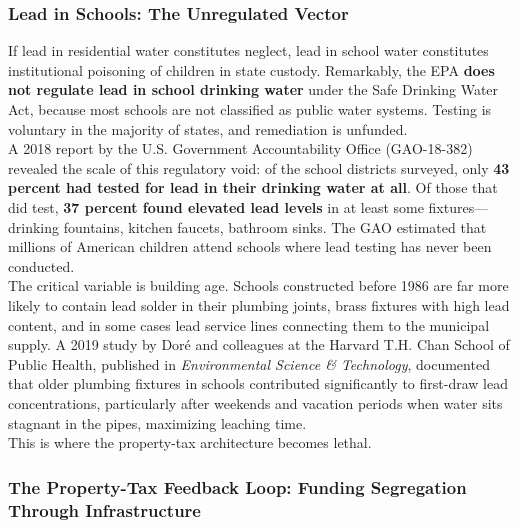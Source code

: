 \documentclass[
]{article}
\begin{document}
\subsubsection{\texorpdfstring{\textbf{Lead in Schools: The Unregulated
Vector}}{Lead in Schools: The Unregulated Vector}}\label{lead-in-schools-the-unregulated-vector}

If lead in residential water constitutes neglect, lead in school water
constitutes institutional poisoning of children in state custody.
Remarkably, the EPA \textbf{does not regulate lead in school drinking
water} under the Safe Drinking Water Act, because most schools are not
classified as public water systems. Testing is voluntary in the majority
of states, and remediation is unfunded.\\
A 2018 report by the U.S. Government Accountability Office
(GAO-18-382) revealed the scale of this regulatory void: of the school
districts surveyed, only \textbf{43 percent had tested for lead in
their drinking water at all}. Of those that did test, \textbf{37
percent found elevated lead levels} in at least some fixtures---drinking
fountains, kitchen faucets, bathroom sinks. The GAO estimated that
millions of American children attend schools where lead testing has
never been conducted.\\
The critical variable is building age. Schools constructed before 1986
are far more likely to contain lead solder in their plumbing joints,
brass fixtures with high lead content, and in some cases lead service
lines connecting them to the municipal supply. A 2019 study by Dor\'{e}
and colleagues at the Harvard T.H. Chan School of Public Health,
published in \emph{Environmental Science \& Technology}, documented that
older plumbing fixtures in schools contributed significantly to
first-draw lead concentrations, particularly after weekends and vacation
periods when water sits stagnant in the pipes, maximizing leaching
time.\\
This is where the property-tax architecture becomes lethal.

\subsubsection{\texorpdfstring{\textbf{The Property-Tax Feedback Loop:
Funding Segregation Through
Infrastructure}}{The Property-Tax Feedback Loop: Funding Segregation Through Infrastructure}}\label{the-property-tax-feedback-loop}
\end{document}
